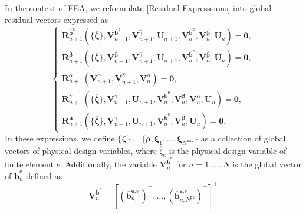 \documentclass[preprint,11pt]{elsarticle}
\theoremstyle{definition}
\begin{document}
In the context of FEA, we reformulate \eqref{Residual Expresssions} into global residual vectors expressed as 
\begin{equation*}
    \left\{ \begin{array}{l}
        \mathbf{R}_{n+1}^{\overline{\mathbf{b}}^\texttt{e}}
        (\{\overline{\boldsymbol{\zeta}}\}, \mathbf{V}_{n+1}^{\overline{\mathbf{b}}^\texttt{e}}, \mathbf{V}_{n+1}^{\widehat{\gamma}}, \mathbf{U}_{n+1}, \mathbf{V}_n^{\overline{\mathbf{b}}^\texttt{e}}, \mathbf{V}_n^{\overline{\boldsymbol{\beta}}}, \mathbf{U}_n) = \mathbf{0}, \\[8pt]
        
        \mathbf{R}_{n+1}^{\overline{\boldsymbol{\beta}}}(\{\overline{\boldsymbol{\zeta}}\}, \mathbf{V}_{n+1}^{\overline{\boldsymbol{\beta}}}, \mathbf{V}_{n+1}^{\widehat{\gamma}}, \mathbf{U}_{n+1}, \mathbf{V}_n^{\overline{\mathbf{b}}^\texttt{e}}, \mathbf{V}_n^{\overline{\boldsymbol{\beta}}}, \mathbf{U}_n) = \mathbf{0}, \\[8pt]
        
        \mathbf{R}_{n+1}^{\alpha}(\mathbf{V}_{n+1}^\alpha, \mathbf{V}_{n+1}^{\widehat{\gamma}}, \mathbf{V}_n^\alpha) = \mathbf{0}, \\[8pt]
        
        \mathbf{R}_{n+1}^{\widehat{\gamma}}(\{\overline{\boldsymbol{\zeta}}\}, \mathbf{V}_{n+1}^{\widehat{\gamma}}, \mathbf{U}_{n+1}, \mathbf{V}_n^{\overline{\mathbf{b}}^\texttt{e}}, \mathbf{V}_n^{\overline{\boldsymbol{\beta}}}, \mathbf{V}_n^\alpha, \mathbf{U}_n) = \mathbf{0}, \\[8pt]
        
        \mathbf{R}_{n+1}^\mathbf{u}(\{\overline{\boldsymbol{\zeta}}\}, \mathbf{V}_{n+1}^{\widehat{\gamma}}, \mathbf{U}_{n+1}, \mathbf{V}_n^{\overline{\mathbf{b}}^\texttt{e}}, \mathbf{V}_n^{\overline{\boldsymbol{\beta}}}, \mathbf{U}_n) = \mathbf{0}.
    \end{array} \right.
\end{equation*}
In these expressions, we define $\{\overline{\boldsymbol{\zeta}}\} = \{ \overline{\boldsymbol{\rho}}, \overline{\boldsymbol{\xi}}_1, \ldots, \overline{\boldsymbol{\xi}}_{N^\texttt{mat}} \}$ as a collection of global vectors of physical design variables, where $\overline{\zeta}_e$ is the physical design variable of finite element $e$. Additionally, the variable $\mathbf{V}_n^{\overline{\mathbf{b}}^\texttt{e}}$ for $n=1,\ldots,N$ is the global vector of $\overline{\mathbf{b}}_n^\texttt{e}$ defined as
\begin{equation*}
    \mathbf{V}_n^{\overline{\mathbf{b}}^\texttt{e}} = \left[ \left(\overline{\mathbf{b}}_{n,1}^\texttt{e,v}\right)^\top, \ldots, \left(\overline{\mathbf{b}}_{n,N^\texttt{pt}}^\texttt{e,v}\right)^\top \right]^\top
\end{equation*}
\end{document}
